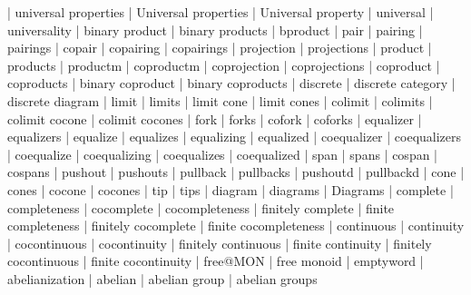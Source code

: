    |   universal properties
    |   Universal properties
    |   Universal property
    |   universal
    |   universality
    |   binary product
    |   binary products
    |   bproduct
    |   pair
    |   pairing
    |   pairings
    |   copair
    |   copairing
    |   copairings
    |   projection
    |   projections
    |   product
    |   products
    |   productm
    |   coproductm
    |   coprojection
    |   coprojections
    |   coproduct
    |   coproducts
    |   binary coproduct
    |   binary coproducts
    |   discrete
    |   discrete category
    |   discrete diagram
    |   limit
    |   limits
    |   limit cone
    |   limit cones
    |   colimit
    |   colimits
    |   colimit cocone
    |   colimit cocones
    |   fork
    |   forks
    |   cofork
    |   coforks
    |   equalizer
    |   equalizers
    |   equalize
    |   equalizes
    |   equalizing
    |   equalized
    |   coequalizer
    |   coequalizers
    |   coequalize
    |   coequalizing
    |   coequalizes
    |   coequalized
    |   span
    |   spans
    |   cospan
    |   cospans
    |   pushout
    |   pushouts
    |   pullback
    |   pullbacks
    |   pushoutd
    |   pullbackd
    |   cone
    |   cones
    |   cocone
    |   cocones
    |   tip
    |   tips
    |   diagram
    |   diagrams
    |   Diagrams
    |   complete
    |   completeness
    |   cocomplete
    |   cocompleteness
    |   finitely complete
    |   finite completeness
    |   finitely cocomplete
    |   finite cocompleteness
    |   continuous
    |   continuity
    |   cocontinuous
    |   cocontinuity
    |   finitely continuous
    |   finite continuity
    |   finitely cocontinuous
    |   finite cocontinuity
    |   free@MON
    |   free monoid
    |   emptyword
    |   abelianization
    |   abelian
    |   abelian group
    |   abelian groups
